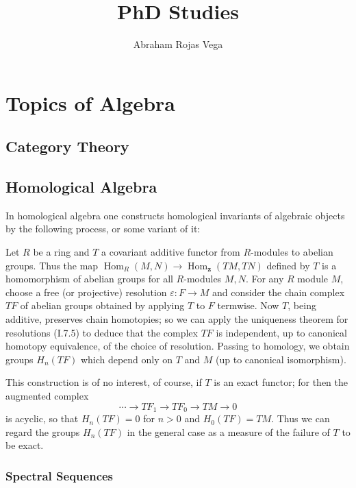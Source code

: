 \documentclass{book}
\title{PhD Studies}
\author{Abraham Rojas Vega}
\begin{document}
\maketitle

\tableofcontents
\part{Topics of Algebra}


\chapter{Category Theory}

\chapter{Homological Algebra}

In homological algebra one constructs homological invariants of algebraic objects by the following process, or some variant of it:

Let $R$ be a ring and $T$ a covariant additive functor from $R$-modules to abelian groups. Thus the map $\operatorname{Hom}_R(M, N) \rightarrow \operatorname{Hom}_{\mathbf{z}}(T M, T N)$ defined by $T$ is a homomorphism of abelian groups for all $R$-modules $M, N$. For any $R$ module $M$, choose a free (or projective) resolution $\varepsilon: F \rightarrow M$ and consider the chain complex $T F$ of abelian groups obtained by applying $T$ to $F$ termwise. Now $T$, being additive, preserves chain homotopies; so we can apply the uniqueness theorem for resolutions (I.7.5) to deduce that the complex $T F$ is independent, up to canonical homotopy equivalence, of the choice of resolution. Passing to homology, we obtain groups $H_n(T F)$ which depend only on $T$ and $M$ (up to canonical isomorphism).

This construction is of no interest, of course, if $T$ is an exact functor; for then the augmented complex
$$
\cdots \rightarrow T F_1 \rightarrow T F_0 \rightarrow T M \rightarrow 0
$$
is acyclic, so that $H_n(T F)=0$ for $n>0$ and $H_0(T F)=T M$. Thus we can regard the groups $H_n(T F)$ in the general case as a measure of the failure of $T$ to be exact.


\section{Spectral Sequences}
\end{document}
